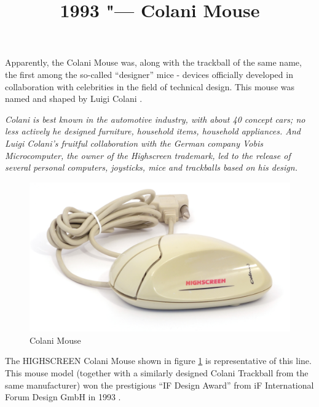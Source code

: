 \documentclass[11pt, a4paper]{article}
\begin{document}
\title{1993 "--- Colani Mouse}
\date{}
\maketitle

Apparently, the Colani Mouse was, along with the trackball of the same name, the first among the so-called “designer” mice - devices officially developed in collaboration with celebrities in the field of technical design. This mouse was named and shaped by Luigi Colani \cite{wiki}.

\textit{Colani is best known in the automotive industry, with about 40 concept cars; no less actively he designed furniture, household items, household appliances. And Luigi Colani's fruitful collaboration with the German company Vobis Microcomputer, the owner of the Highscreen trademark, led to the release of several personal computers, joysticks, mice and trackballs based on his design.}

\begin{figure}[h]
    \centering
    \includegraphics[scale=0.6]{1993_colani_mouse/pic_60.jpg}
    \caption{Colani Mouse}
    \label{fig:ColaniMousePic}
\end{figure}

The HIGHSCREEN Colani Mouse shown in figure \ref{fig:ColaniMousePic} is representative of this line. This mouse model (together with a similarly designed Colani Trackball from the same manufacturer) won the prestigious “IF Design Award” from iF International Forum Design GmbH in 1993 \cite{award}.
\end{document}

